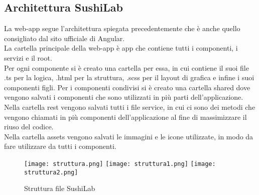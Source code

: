 \subsection{Architettura SushiLab}
La web-app segue l'architettura spiegata precedentemente che è anche quello consigliato dal sito ufficiale di Angular.\\
La cartella principale della web-app è app che contiene tutti i componenti, i servizi e il root.\\ 
Per ogni componente si è creato una cartella per essa, in cui contiene il suoi file .ts per la logica, .html per la struttura, .scss per il layout di grafica e infine i suoi componenti figli. Per i componenti condivisi si è creato una cartella shared dove vengono salvati i componenti che sono utilizzati in più parti dell'applicazione.\\
Nella cartella rest vengono salvati tutti i file service, in cui ci sono dei metodi che vengono chiamati in più componenti dell'applicazione al fine di massimizzare il riuso del codice.\\
Nella cartella assets vengono salvati le immagini e le icone utilizzate, in modo da fare utilizzare da tutti i componenti.\\
\begin{figure}[H]
    \centering
    \texttt{[image: struttura.png]}
    \texttt{[image: struttura1.png]}
    \texttt{[image: struttura2.png]}
    \caption{Struttura file SushiLab}
\end{figure}
